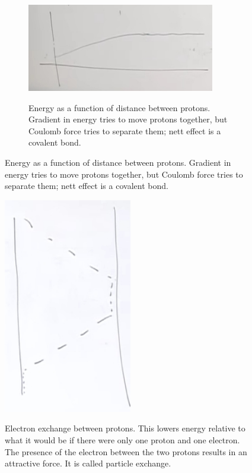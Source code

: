 \documentclass[]{article}
\begin{document}
\begin{figure}[H]
\begin{subfigure}[t]{0.45\textwidth}
		\caption{Energy as a function of distance between protons. Gradient in energy tries to move protons together, but Coulomb force tries to separate them; nett effect is a covalent bond.}
		\includegraphics[width=0.9\textwidth]{2proton1ElectronEnergy}\label{fig:2proton1ElectronEnergy}
	\end{subfigure}

\end{figure}

\begin{figure}[H]
	\begin{center}
		\caption{Electron exchange between protons. This lowers energy relative to what it would be if there were only one proton and one electron. The presence of the electron between the two protons results in an attractive force. It is called particle exchange.}
		\includegraphics[width=0.5\textwidth]{2proton1ElectronHopping}\label{fig:2proton1ElectronHopping}
	\end{center}
\end{figure}
\end{document}
